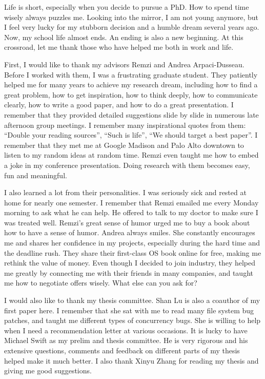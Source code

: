 
Life is short, especially when you decide to pursue a PhD. How to
spend time wisely always puzzles me. Looking into the mirror, I am not
young anymore, but I feel very lucky for my stubborn decision and a
humble dream several years ago. Now, my school life almost ends. An
ending is also a new beginning. At this crossroad, let me thank those 
who have helped me both in work and life. 

First, I would like to thank my advisors Remzi and Andrea
Arpaci-Dusseau. Before I worked with them, I was a frustrating
graduate student. They patiently helped me for many years to achieve
my research dream, including how to find a great 
problem, how to get inspiration, how to think deeply, how 
to communicate clearly, how to write a good paper, and how to do a
great presentation. I remember that they provided detailed suggestions
slide by slide in numerous late afternoon group meetings. I remember
many inspirational quotes from them: ``Double your reading sources'',
``Such is life'', ``We should target a best paper''. I remember that
they met me at Google Madison and Palo Alto downtown to listen to my
random ideas at random time. Remzi even taught me how to embed a joke
in my conference presentation. Doing research with them becomes easy,
fun and meaningful. 

I also learned a lot from their personalities. I was seriously sick
and rested at home for nearly one semester. I remember that Remzi
emailed me every Monday morning to ask what he can help. He offered to
talk to my doctor to make sure I was treated well. Remzi's great sense
of humor urged me to buy a book about how to have a sense of
humor. Andrea always smiles. She constantly encourages me and shares 
her confidence in my projects, especially during the hard time and the
deadline rush. They share their first-class OS book online for free,
making me rethink the value of money. Even though I decided to join
industry, they helped me greatly by connecting me with their friends
in many companies, and taught me how to negotiate offers wisely. What
else can you ask for? 

I would also like to thank my thesis committee. Shan Lu is also a
coauthor of my first paper here. I remember that she sat with me to
read many file system bug patches, and taught me different types of
concurrency bugs. She is willing to help when I need a recommendation
letter at various occasions. It is lucky to have Michael Swift as my
prelim and thesis committee. He is very rigorous and his extensive
questions, comments and feedback on different parts of my thesis
helped make it much better. I also thank Xinyu Zhang for reading my
thesis and giving me good suggestions. 


